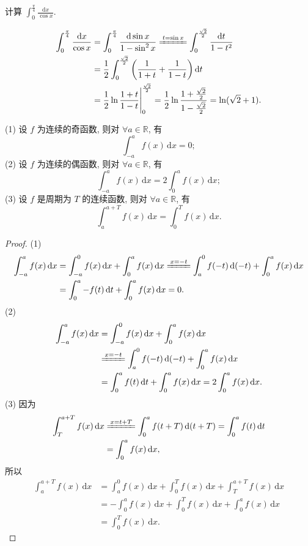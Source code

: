 \begin{example}\label{ex:6.4.8}
计算 $\displaystyle\int_{0}^{\frac{\pi}{4}}\frac{\mathrm{d}x}{\cos x}$.
\end{example}
\begin{solution}
\begin{align*}
\int_{0}^{\frac{\pi}{4}}\frac{\mathrm{d}x}{\cos x}&=\int_{0}^{\frac{\pi}{4}}\frac{\mathrm{d}\sin x}{1-\sin^{2}x}\xlongequal{t=\sin x}\int_{0}^{\frac{\sqrt{2}}{2}}\frac{\mathrm{d}t}{1-t^{2}}\\
&=\frac{1}{2}\int_{0}^{\frac{\sqrt{2}}{2}}\left(\frac{1}{1+t}+\frac{1}{1-t}\right)\mathrm{d}t\\
&=\frac{1}{2}\ln\frac{1+t}{1-t}\Bigg|_{0}^{\frac{\sqrt{2}}{2}}=\frac{1}{2}\ln\frac{1+\frac{\sqrt{2}}{2}}{1-\frac{\sqrt{2}}{2}}=\ln(\sqrt{2}+1).
\end{align*}
\end{solution}
\begin{example}\label{ex:6.4.9}
(1) 设 $f$ 为连续的奇函数, 则对 $\forall a\in\mathbb{R}$, 有
\[
\int_{-a}^{a}f(x)\,\mathrm{d}x=0;
\]
(2) 设 $f$ 为连续的偶函数, 则对 $\forall a\in\mathbb{R}$, 有
\[
\int_{-a}^{a}f(x)\,\mathrm{d}x=2\int_{0}^{a}f(x)\,\mathrm{d}x;
\]
(3) 设 $f$ 是周期为 $T$ 的连续函数, 则对 $\forall a\in\mathbb{R}$, 有
\[
\int_{a}^{a+T}f(x)\,\mathrm{d}x=\int_{0}^{T}f(x)\,\mathrm{d}x.
\]
\end{example}

\begin{proof}
(1)
\begin{align*}
\int_{-a}^{a}f(x)\,\mathrm{d}x&=\int_{-a}^{0}f(x)\,\mathrm{d}x+\int_{0}^{a}f(x)\,\mathrm{d}x\xlongequal{x=-t}\int_{a}^{0}f(-t)\,\mathrm{d}(-t)+\int_{0}^{a}f(x)\,\mathrm{d}x\\
&=\int_{0}^{a}-f(t)\,\mathrm{d}t+\int_{0}^{a}f(x)\,\mathrm{d}x=0.
\end{align*}
(2)
\begin{align*}
\int_{-a}^{a}f(x)\,\mathrm{d}x&=\int_{-a}^{0}f(x)\,\mathrm{d}x+\int_{0}^{a}f(x)\,\mathrm{d}x\\
&\xlongequal{x=-t}\int_{a}^{0}f(-t)\,\mathrm{d}(-t)+\int_{0}^{a}f(x)\,\mathrm{d}x\\
&=\int_{0}^{a}f(t)\,\mathrm{d}t+\int_{0}^{a}f(x)\,\mathrm{d}x=2\int_{0}^{a}f(x)\,\mathrm{d}x.
\end{align*}
(3) 因为
\begin{align*}
\int_{T}^{a+T}f(x)\,\mathrm{d}x&\xlongequal{x=t+T}\int_{0}^{a}f(t+T)\,\mathrm{d}(t+T)=\int_{0}^{a}f(t)\,\mathrm{d}t\\
&=\int_{0}^{a}f(x)\,\mathrm{d}x,
\end{align*}
所以
\begin{align*}
\int_{a}^{a+T}f(x)\,\mathrm{d}x&=\int_{a}^{0}f(x)\,\mathrm{d}x+\int_{0}^{T}f(x)\,\mathrm{d}x+\int_{T}^{a+T}f(x)\,\mathrm{d}x\\
&=-\int_{0}^{a}f(x)\,\mathrm{d}x+\int_{0}^{T}f(x)\,\mathrm{d}x+\int_{0}^{a}f(x)\,\mathrm{d}x\\
&=\int_{0}^{T}f(x)\,\mathrm{d}x.
\end{align*}
\end{proof}

